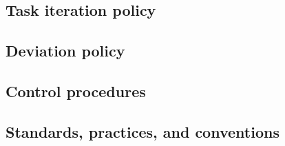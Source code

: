 \subsection{Task iteration policy} \label{s:details-of-the-master-test-plan:task-iteration-policy}
	\begin{comment}
		$<$ Describe the criteria used to determine the extent to which a testing task is repeated when its input is changed or task procedure is changed (e.g., reexecuting tests after anomalies have been fixed). These criteria may include assessments of change, integrity level, and effects on budget, schedule, and quality. $>$
	\end{comment}

\subsection{Deviation policy} \label{s:details-of-the-master-test-plan:deviation-policy}
	\begin{comment}
		$<$ Describe the procedures and criteria used to deviate from the MTP and level test documentation after they are developed. The information required for deviations includes task identification, rationale, and effect on system/software quality. Identify the authorities responsible for approving deviations. $>$
	\end{comment}

\subsection{Control procedures} \label{s:details-of-the-master-test-plan:control-procedures}
	\begin{comment}
		$<$ Identify control procedures applied to the test activities. These procedures describe how the softwarebased system and software products and test results will be configured, protected, and stored.\\
		These procedures may describe quality assurance, configuration management, data management, or other activities if they are not addressed by other efforts. Describe how the test activities comply with existing security provisions and how the test results are to be protected from unauthorized alterations. $>$
	\end{comment}

\subsection{Standards, practices, and conventions} \label{s:details-of-the-master-test-plan:standards-practices-and-conventions}
	\begin{comment}
		$<$ Identify the standards, practices, and conventions that govern the performance of testing tasks including, but not limited to, internal organizational standards, practices, and policies. $>$
	\end{comment}

